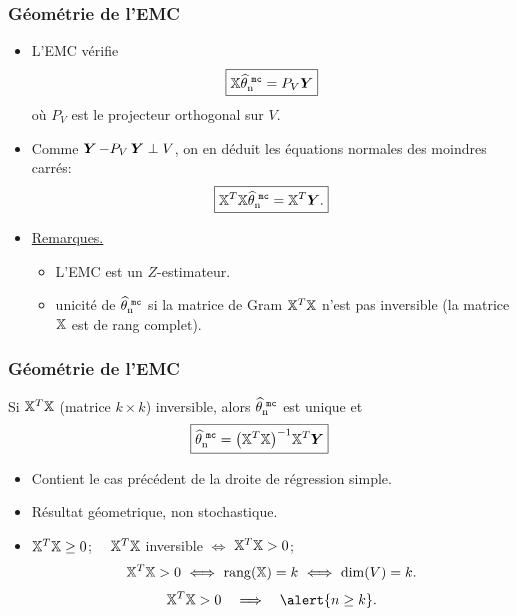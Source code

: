  \begin{frame}
\frametitle{Géométrie de l'EMC}
 \begin{itemize}
 \item L'EMC vérifie
$$\boxed{\mathbb{X} {\operatorname{\widehat \theta_n^{\,\,{\tt mc}}}} = P_V \boldsymbol{Y}}$$
o\`u $P_V$ est le projecteur orthogonal sur $V$.
\item Comme $ \operatorname{\boldsymbol{Y}} - P_V \operatorname{\boldsymbol{Y}} \perp V$, on en déduit \alert{les équations normales des
moindres carrés}:
$$\boxed{\mathbb{X}^T\mathbb{X} {\operatorname{\widehat \theta_n^{\,\,{\tt mc}}}} =
\mathbb{X}^T\boldsymbol{Y}.}$$
\item \underline{Remarques.}
  \begin{itemize}
  \item L'EMC est un $Z$-estimateur.
  \item \alert{unicité} de $\operatorname{\widehat \theta_n^{\,\,{\tt mc}}}$ si la matrice de Gram
  $\mathbb{X}^T\mathbb{X}$ n'est pas inversible (la matrice $\mathbb{X}$ est de rang complet).
  \end{itemize}
\end{itemize}
\end{frame}

\begin{frame} \frametitle{Géométrie de l'EMC}
\begin{prop}
Si $\mathbb{X}^T\mathbb{X}$ (matrice $k \times k$) inversible, alors
$\operatorname{\widehat \theta_n^{\,\,{\tt mc}}}$ \alert{est unique} et
$$\boxed{\operatorname{\widehat \theta_n^{\,\,{\tt mc}}} = \big(\mathbb{X}^T\mathbb{X}\big)^{-1}\mathbb{X}^T \boldsymbol{Y}}$$
\end{prop}
\begin{itemize}
\item Contient le cas précédent de la droite de régression simple.
\item Résultat géometrique, \alert{non stochastique}.
\item $\mathbb{X}^T\mathbb{X}\ge0$; \ \ $\mathbb{X}^T\mathbb{X}$
inversible $\Longleftrightarrow$ $\mathbb{X}^T\mathbb{X}>0$;
$$\regressmat^T\regressmat>0 \ \Longleftrightarrow \ {\rm rang}(\regressmat)=k
\ \Longleftrightarrow \ {\rm dim}(V)=k.$$
$$\regressmat^T\regressmat>0 \quad \Longrightarrow \quad \alert{ n \geq k}.$$
\end{itemize}
\end{frame}


